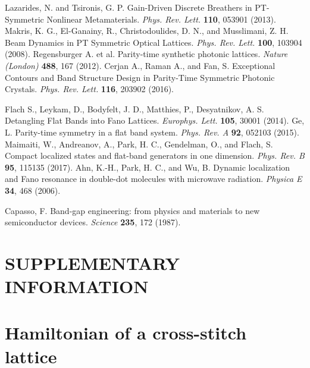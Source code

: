 \documentclass[report,epsfig,pre]{revtex4}
\begin{document}
\begin{thebibliography}{150}
 Lazarides, N. and Tsironis, G. P. Gain-Driven Discrete Breathers in PT-Symmetric Nonlinear Metamaterials. \textit{Phys. Rev. Lett.} {\bf 110}, 053901 (2013).
 Makris, K. G., El-Ganainy, R., Christodoulides, D. N., and Musslimani, Z. H. Beam Dynamics in PT Symmetric Optical Lattices. \textit{Phys. Rev. Lett.} {\bf 100}, 103904 (2008).
 Regensburger A. et al. Parity-time synthetic photonic lattices. \textit{Nature (London)} {\bf 488}, 167 (2012).
 Cerjan A., Raman A., and Fan, S. Exceptional Contours and Band Structure Design in Parity-Time Symmetric Photonic Crystals. \textit{Phys. Rev. Lett.} {\bf 116}, 203902 (2016).

 Flach S., Leykam, D., Bodyfelt, J. D., Matthies, P., Desyatnikov, A. S. Detangling Flat Bands into Fano Lattices. \textit{Europhys. Lett.} {\bf 105}, 30001 (2014).
 Ge, L. Parity-time symmetry in a flat band system. \textit{Phys. Rev. A} {\bf 92}, 052103 (2015).
 Maimaiti, W., Andreanov, A., Park, H. C., Gendelman, O., and Flach, S. Compact localized states and flat-band generators in one dimension. \textit{Phys. Rev. B} {\bf 95}, 115135 (2017).
 Ahn, K.-H., Park, H. C., and Wu, B.  Dynamic localization and Fano resonance in double-dot molecules with microwave radiation. \textit{Physica E} {\bf 34}, 468 (2006).

 Capasso, F. Band-gap engineering: from physics and materials to new semiconductor devices. \textit{Science} {\bf 235}, 172 (1987).

\end{thebibliography}






\newpage

\section*{SUPPLEMENTARY INFORMATION}

\section{Hamiltonian of a cross-stitch lattice}
\end{document}
